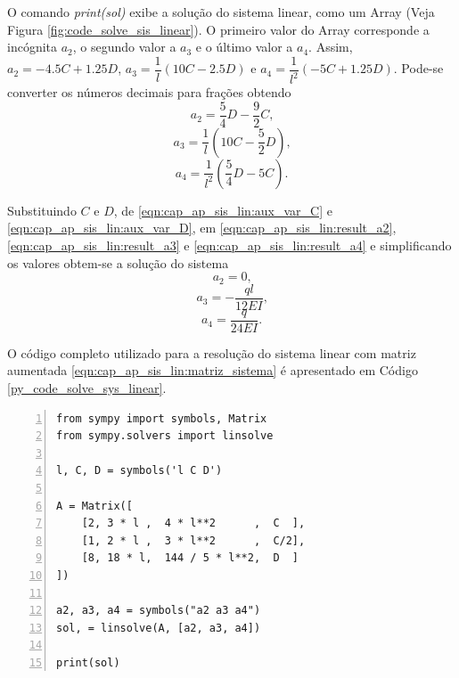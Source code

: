 \documentclass[
	12pt,				%
	openright,			%
    twoside,			%
	a4paper,			%
	english,			%
	french,				%
	spanish,			%
	brazil				%
	]{abntex2}
\numberwithin{lema}{chapter}
\numberwithin{teorema}{chapter}
\numberwithin{definicao}{chapter}
\numberwithin{exemplo}{chapter}
\numberwithin{figure}{chapter}
\begin{document}
\begin{apendicesenv}
{	O comando \textit{print(sol)} exibe a solução do sistema linear, como um Array (Veja Figura \ref{fig:code_solve_sis_linear}). O primeiro valor do Array corresponde a incógnita $a_2$, o segundo valor a $a_3$ e o último valor a $a_4$. Assim, $a_2=-4.5C+1.25D$, $a_3=\dfrac{1}{l}(10C-2.5D)$ e $a_4=\dfrac{1}{l^2}(-5C+1.25D)$. Pode-se converter os números decimais para frações obtendo
	\begin{equation}
		\label{eqn:cap_ap_sis_lin:result_a2}
		a_2=\frac{5}{4}D-\frac{9}{2}C
		\text{,}
	\end{equation}
	\begin{equation}
		\label{eqn:cap_ap_sis_lin:result_a3}
		a_3=\frac{1}{l}\left (
			10C - \frac{5}{2} D
		\right ) \text{,}
	\end{equation}
	\begin{equation}
		\label{eqn:cap_ap_sis_lin:result_a4}
		a_4=\frac{1}{l^2}\left (
			\frac{5}{4}D-5C
		\right ) \text{.}
	\end{equation}
	
	Substituindo $C$ e $D$, de \eqref{eqn:cap_ap_sis_lin:aux_var_C} e \eqref{eqn:cap_ap_sis_lin:aux_var_D}, em \eqref{eqn:cap_ap_sis_lin:result_a2}, \eqref{eqn:cap_ap_sis_lin:result_a3} e \eqref{eqn:cap_ap_sis_lin:result_a4} e simplificando os valores obtem-se a solução do sistema
	$$
		a_2 = 0\text{,}
	$$
	$$
		a_3 = -\frac{ql}{12EI}\text{,}
	$$
	$$
		a_4 = \frac{q}{24EI}\text{.}
	$$

	O código completo utilizado para a resolução do sistema linear com matriz aumentada \eqref{eqn:cap_ap_sis_lin:matriz_sistema} é apresentado em Código \ref{py_code_solve_sys_linear}.
		
	\begin{lstlisting}[style=Python, xleftmargin=2em, numbers=left, caption=Resolução de Sistemas Lineares em Python, captionpos=t, label=py_code_solve_sys_linear]
from sympy import symbols, Matrix
from sympy.solvers import linsolve

l, C, D = symbols('l C D')

A = Matrix([
    [2, 3 * l ,  4 * l**2      ,  C  ],
    [1, 2 * l ,  3 * l**2      ,  C/2],
    [8, 18 * l,  144 / 5 * l**2,  D  ]
])

a2, a3, a4 = symbols("a2 a3 a4")
sol, = linsolve(A, [a2, a3, a4])

print(sol)
	\end{lstlisting}
}

\end{apendicesenv}

\iffalse
\end{document}
